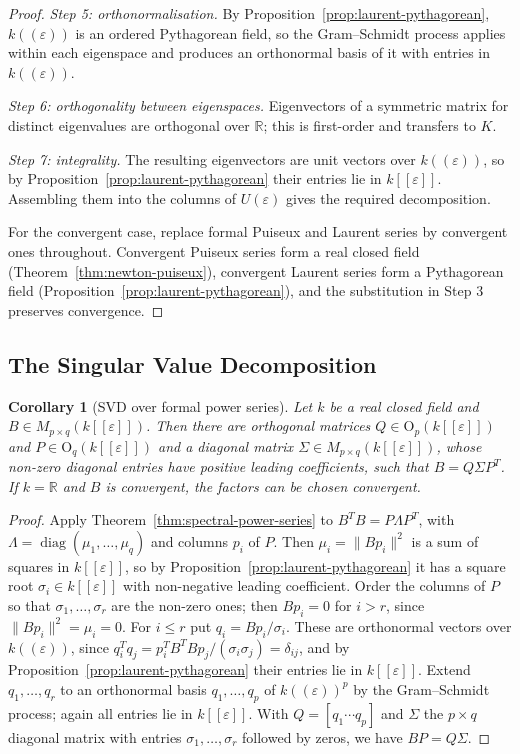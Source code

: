 \documentclass[12pt, a4paper]{report}
\theoremstyle{plain}
\newtheorem{corollary}[theorem]{Corollary}
\theoremstyle{definition}
\theoremstyle{remark}
\theoremstyle{plain}
\newcommand{\RR}{\mathbb{R}}
\newcommand{\Or}{\mathrm{O}}
\DeclareMathOperator{\diag}{diag}
\begin{document}
\begin{proof}
\emph{Step 5: orthonormalisation.} By Proposition~\ref{prop:laurent-pythagorean}, $k((\varepsilon))$ is an ordered Pythagorean field, so the Gram--Schmidt process applies within each eigenspace and produces an orthonormal basis of it with entries in $k((\varepsilon))$.

\emph{Step 6: orthogonality between eigenspaces.} Eigenvectors of a symmetric matrix for distinct eigenvalues are orthogonal over $\RR$; this is first-order and transfers to $K$.

\emph{Step 7: integrality.} The resulting eigenvectors are unit vectors over $k((\varepsilon))$, so by Proposition~\ref{prop:laurent-pythagorean} their entries lie in $k[[\varepsilon]]$. Assembling them into the columns of $U(\varepsilon)$ gives the required decomposition.

For the convergent case, replace formal Puiseux and Laurent series by convergent ones throughout. Convergent Puiseux series form a real closed field (Theorem~\ref{thm:newton-puiseux}), convergent Laurent series form a Pythagorean field (Proposition~\ref{prop:laurent-pythagorean}), and the substitution in Step 3 preserves convergence.
\end{proof}

\subsection{The Singular Value Decomposition}
\begin{corollary}[SVD over formal power series]\label{cor:svd-power-series}
Let $k$ be a real closed field and $B\in M_{p\times q}(k[[\varepsilon]])$. Then there are orthogonal matrices $Q\in\Or_p(k[[\varepsilon]])$ and $P\in\Or_q(k[[\varepsilon]])$ and a diagonal matrix $\Sigma\in M_{p\times q}(k[[\varepsilon]])$, whose non-zero diagonal entries have positive leading coefficients, such that $B=Q\Sigma P^T$. If $k=\RR$ and $B$ is convergent, the factors can be chosen convergent.
\end{corollary}
\begin{proof}
Apply Theorem~\ref{thm:spectral-power-series} to $B^TB=P\Lambda P^T$, with $\Lambda=\diag(\mu_1,\dots,\mu_q)$ and columns $p_i$ of $P$. Then $\mu_i=\|Bp_i\|^2$ is a sum of squares in $k[[\varepsilon]]$, so by Proposition~\ref{prop:laurent-pythagorean} it has a square root $\sigma_i\in k[[\varepsilon]]$ with non-negative leading coefficient. Order the columns of $P$ so that $\sigma_1,\dots,\sigma_r$ are the non-zero ones; then $Bp_i=0$ for $i>r$, since $\|Bp_i\|^2=\mu_i=0$. For $i\leq r$ put $q_i=Bp_i/\sigma_i$. These are orthonormal vectors over $k((\varepsilon))$, since $q_i^Tq_j=p_i^TB^TBp_j/(\sigma_i\sigma_j)=\delta_{ij}$, and by Proposition~\ref{prop:laurent-pythagorean} their entries lie in $k[[\varepsilon]]$. Extend $q_1,\dots,q_r$ to an orthonormal basis $q_1,\dots,q_p$ of $k((\varepsilon))^p$ by the Gram--Schmidt process; again all entries lie in $k[[\varepsilon]]$. With $Q=[q_1\cdots q_p]$ and $\Sigma$ the $p\times q$ diagonal matrix with entries $\sigma_1,\dots,\sigma_r$ followed by zeros, we have $BP=Q\Sigma$.
\end{proof}
\end{document}
